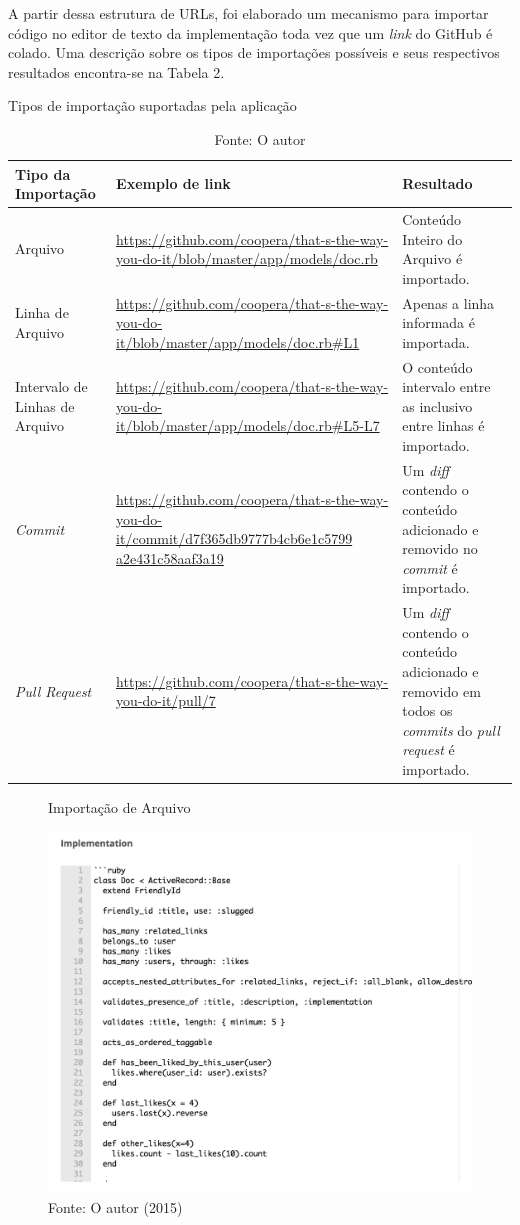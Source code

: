 A partir dessa estrutura de URLs, foi elaborado um mecanismo para importar código no editor de texto da implementação toda vez que um \textit{link} do GitHub é colado. Uma descrição sobre os tipos de importações possíveis e seus respectivos resultados encontra-se na Tabela 2.

\begin{table}[]
\centering
    \caption{Tipos de importação suportadas pela aplicação}
    \label{my-label}
    \begin{tabular}{p{3cm} | p{7cm} | p{5cm}}
    \hline
    Tipo da Importação & Exemplo de link & Resultado \\ \hline
    Arquivo & \url{https://github.com/coopera/that-s-the-way-you-do-it/blob/master/app/models/doc.rb} & Conteúdo Inteiro do Arquivo é importado. \\ \hline
    Linha de Arquivo & \url{https://github.com/coopera/that-s-the-way-you-do-it/blob/master/app/models/doc.rb\#L1} & Apenas a linha informada é importada. \\ \hline
    Intervalo de Linhas de Arquivo & \url{https://github.com/coopera/that-s-the-way-you-do-it/blob/master/app/models/doc.rb\#L5-L7} & O conteúdo intervalo entre as inclusivo entre linhas é importado. \\ \hline
    \textit{Commit} & \url{https://github.com/coopera/that-s-the-way-you-do-it/commit/d7f365db9777b4cb6e1c5799}
    \url{a2e431c58aaf3a19} & Um \textit{diff} contendo o conteúdo adicionado e removido no \textit{commit} é importado. \\ \hline
    \textit{Pull Request} & \url{https://github.com/coopera/that-s-the-way-you-do-it/pull/7} & Um \textit{diff} contendo o conteúdo adicionado e removido em todos os \textit{commits} do \textit{pull request} é importado.  \\ \hline
\end{tabular}
\caption*{Fonte: O autor}
\end{table}

\begin{figure}[h]
	\centering
    \caption{Importação de Arquivo}
    \includegraphics[width=15cm]{Imagens/import-file.png}
	\caption*{Fonte: O autor (2015)}
\end{figure}

